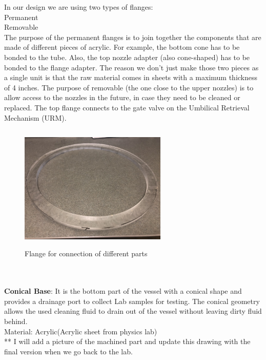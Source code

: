 In our design we are using two types of flanges:\\

Permanent \\

Removable\\

The purpose of the permanent flanges is to join together the components that are made of different pieces of acrylic.  For example, the bottom cone has to be bonded to the tube.  Also, the top nozzle adapter (also cone-shaped) has to be bonded to the flange adapter.  The reason we don’t just make those two pieces as a single unit is that the raw material comes in sheets with a maximum thickness of 4 inches.  The purpose of  removable (the one close to the upper nozzles) is to allow access to the nozzles in the future, in case they need to be cleaned or replaced.  The top flange connects to the gate valve on the Umbilical Retrieval Mechanism (URM).
\begin{figure}[!htpb]
  \centering
  \includegraphics[width = 7cm, height=6cm ]{figures/flange1}
  \caption{Flange for connection of different parts}
  \label{fig:flange1}
\end{figure}
\\
\\
\textbf{Conical Base}:
It is the bottom part of the vessel with a conical shape and provides a drainage port to collect Lab samples for testing. The conical geometry allows the used cleaning fluid to drain out of the vessel without leaving dirty fluid behind.
\\
Material: Acrylic(Acrylic sheet from physics lab)\\
** I will add a picture of the machined part and update this drawing with the final version when we go back to the lab.\\
